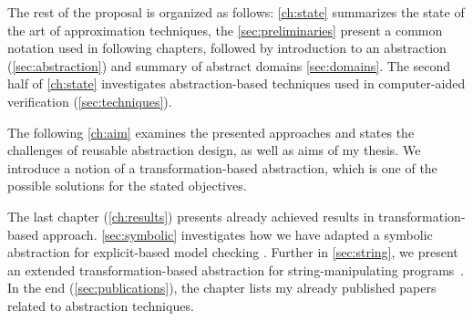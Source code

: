 The rest of the proposal is organized as follows: \autoref{ch:state} summarizes the state of the art of approximation techniques, the \autoref{sec:preliminaries} present a common notation used in following chapters, followed by introduction to an abstraction (\autoref{sec:abstraction}) and summary of abstract domains \autoref{sec:domains}. The second half of \autoref{ch:state} investigates abstraction-based techniques used in computer-aided verification (\autoref{sec:techniques}).

The following \autoref{ch:aim} examines the presented approaches and states the
challenges of reusable abstraction design, as well as aims of my thesis. We
introduce a notion of a transformation-based abstraction, which is one of the
possible solutions for the stated objectives.

The last chapter (\autoref{ch:results}) presents already achieved results in
transformation-based approach.  \autoref{sec:symbolic} investigates how we have
adapted a symbolic abstraction for explicit-based model checking
\cite{Lauko2019Sym, Lauko2018SymComp}. Further in \autoref{sec:string}, we
pre\-sent an extended transformation-based abstraction for string-ma\-ni\-pu\-la\-ting
programs~\cite{Lauko2019String}.  In the end (\autoref{sec:publications}), the
chapter lists my already published papers related to abstraction techniques.
